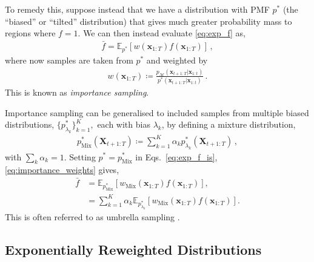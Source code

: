 \documentclass{article}
\newcommand{\realtraj}{\mathbf{x}}
\newcommand{\unrealtraj}{\mathbf{X}}
\newcommand{\bias}{\lambda}
\newcommand{\EV}{\mathbb{E}}
\newcommand{\pdf}{p}
\newcommand{\pdfmodel}{p_{\mathcal{M}}}
\begin{document}
To remedy this, suppose instead that we have a distribution with PMF $\pdf^*$ (the ``biased'' or ``tilted'' distribution) that gives much greater probability mass to regions where $f = 1$.
We can then instead evaluate \eqref{eq:exp_f} as,
\begin{align}
    \bar{f} = \EV_{\pdf^*}\left[w(\realtraj_{1:T}) f(\realtraj_{1:T}) \right] \,,
    \label{eq:exp_f_is}
\end{align}
where now samples are taken from $\pdf^*$ and weighted by
\begin{align}
    w(\realtraj_{1:T})
    \coloneqq
    \frac{\pdfmodel(\realtraj_{t+1:T} | \realtraj_{1:t})}{\pdf^*(\realtraj_{t+1:T} | \realtraj_{1:t})}
    \,.
    \label{eq:importance_weights}
\end{align}
This is known as \textit{importance sampling}.

Importance sampling can be generalised to included samples from multiple biased distributions, $\{ \pdf_{\bias_k}^{*} \}_{k=1}^K,$ each with bias $\bias_k$, by defining a mixture distribution,
\begin{align}
    \pdf_{\text{Mix}}^{*}(\unrealtraj_{t+1:T})
    \coloneqq
    \sum_{k=1}^K \alpha_{k} \pdf_{\bias_k}^{*}(\unrealtraj_{t+1:T})
    \, ,
\end{align}
with $\sum_k \alpha_k = 1$. Setting $\pdf^* = \pdf_{\text{Mix}}^{*}$ in Eqs.~\eqref{eq:exp_f_is}, \eqref{eq:importance_weights} gives,
\begin{align}
    \bar{f} & = \EV_{\pdf_{\text{Mix}}^{*}}\left[ w_{\text{Mix}}(\realtraj_{1:T}) f(\realtraj_{1:T}) \right], \nonumber          \\
            & = \sum_{k=1}^K \alpha_k \EV_{\pdf_{\bias_k}^{*}}\left[ w_{\text{Mix}}(\realtraj_{1:T}) f(\realtraj_{1:T}) \right].
    \label{eq:exp_f_umbrella}
\end{align}
This is often referred to as umbrella sampling \cite{torrie1977nonphysical,dinner2020stratification,li2023understanding}.

\subsection{Exponentially Reweighted Distributions}
\end{document}
